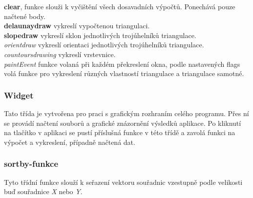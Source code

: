 \documentclass{article}
\begin{document}
\textbf{clear}, funkce slouži k vyčištění všech dosavadních výpočtů. Ponechává pouze načtené body. \\

\textbf{delaunaydraw} vykreslí vypočtenou triangulaci. \\
\textbf{slopedraw} vykreslí sklon jednotlivých trojúhelníků triangulace. \\
\textit{orientdraw} vykreslí orientaci jednotlivých trojúhelníků triangulace. \\
\textit{countoursdrawing} vykreslí vrstevnice. \\
\textit{paintEvent} funkce volaná při každém překreslení okna, podle nastavených flags volá funkce pro vykreslení různých vlastností triangulace a triangulace samotné. \\

\subsubsection{Widget} 

Tato třída je vytvořena pro praci s grafickým rozhraním celého programu. Přes ní se provádí načtení souborů a grafické znázornění výsledků aplikace. Po kliknutí na tlačítko v aplikaci se pustí příslušná funkce v této třídě a zavolá funkci na výpočet a vykreslení, případně načtená dat.\\ 

\subsubsection{sortby-funkce}
Tyto třídní funkce slouží k seřazení vektoru souřadnic vzestupně podle velikosti buď souřadnice \textit{X} nebo \textit{Y}.
\end{document}
